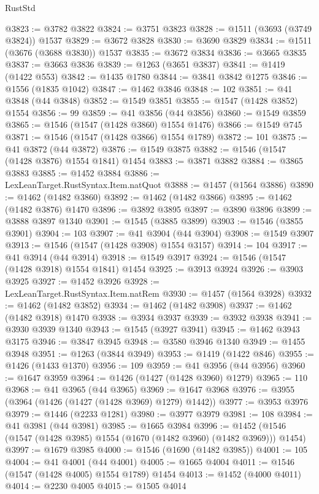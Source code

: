\begin{lexlean}{RustStd}
\begin{coremodule}
{\begin{coremodule}
{{{{{{{{{{{{{{{{{{{{{{{{{{{{{{@3823 := @3782 @3822
@3824 := @3751 @3823
@3828 := @1511 (@3693 (@3749 @3824)) @1537
@3829 := @3672 @3828
@3830 := @3690 @3829
@3834 := @1511 (@3676 (@3688 @3830)) @1537
@3835 := @3672 @3834
@3836 := @3665 @3835
@3837 := @3663 @3836
@3839 := @1263 (@3651 @3837)
@3841 := @1419 (@1422 @553)
@3842 := @1435 @1780
@3844 := @3841 @3842 @1275
@3846 := @1556 (@1835 @1042)
@3847 := @1462 @3846
@3848 := 102
@3851 := @41 @3848 (@44 @3848)
@3852 := @1549 @3851
@3855 := @1547 (@1428 @3852) @1554
@3856 := 99
@3859 := @41 @3856 (@44 @3856)
@3860 := @1549 @3859
@3865 := @1546 (@1547 (@1428 @3860) @1554 @1476)
@3866 := @1549 @745
@3871 := @1546 (@1547 (@1428 @3866) @1554 @1789)
@3872 := 101
@3875 := @41 @3872 (@44 @3872)
@3876 := @1549 @3875
@3882 := @1546 (@1547 (@1428 @3876) @1554 @1841) @1454
@3883 := @3871 @3882
@3884 := @3865 @3883
@3885 := @1452 @3884
@3886 := LexLeanTarget.RustSyntax.Item.natQuot
@3888 := @1457 (@1564 @3886)
@3890 := @1462 (@1482 @3860)
@3892 := @1462 (@1482 @3866)
@3895 := @1462 (@1482 @3876) @1470
@3896 := @3892 @3895
@3897 := @3890 @3896
@3899 := @3888 @3897 @1340
@3901 := @1545 (@3885 @3899)
@3903 := @1546 (@3855 @3901)
@3904 := 103
@3907 := @41 @3904 (@44 @3904)
@3908 := @1549 @3907
@3913 := @1546 (@1547 (@1428 @3908) @1554 @3157)
@3914 := 104
@3917 := @41 @3914 (@44 @3914)
@3918 := @1549 @3917
@3924 := @1546 (@1547 (@1428 @3918) @1554 @1841) @1454
@3925 := @3913 @3924
@3926 := @3903 @3925
@3927 := @1452 @3926
@3928 := LexLeanTarget.RustSyntax.Item.natRem
@3930 := @1457 (@1564 @3928)
@3932 := @1462 (@1482 @3852)
@3934 := @1462 (@1482 @3908)
@3937 := @1462 (@1482 @3918) @1470
@3938 := @3934 @3937
@3939 := @3932 @3938
@3941 := @3930 @3939 @1340
@3943 := @1545 (@3927 @3941)
@3945 := @1462 @3943 @3175
@3946 := @3847 @3945
@3948 := @3580 @3946 @1340
@3949 := @1455 @3948
@3951 := @1263 (@3844 @3949)
@3953 := @1419 (@1422 @846)
@3955 := @1426 (@1433 @1370)
@3956 := 109
@3959 := @41 @3956 (@44 @3956)
@3960 := @1647 @3959
@3964 := @1426 (@1427 (@1428 @3960) @1279)
@3965 := 110
@3968 := @41 @3965 (@44 @3965)
@3969 := @1647 @3968
@3976 := @3955 (@3964 (@1426 (@1427 (@1428 @3969) @1279) @1442))
@3977 := @3953 @3976
@3979 := @1446 (@2233 @1281)
@3980 := @3977 @3979
@3981 := 108
@3984 := @41 @3981 (@44 @3981)
@3985 := @1665 @3984
@3996 := @1452 (@1546 (@1547 (@1428 @3985) @1554 (@1670 (@1482 @3960) (@1482 @3969))) @1454)
@3997 := @1679 @3985
@4000 := @1546 (@1690 (@1482 @3985))
@4001 := 105
@4004 := @41 @4001 (@44 @4001)
@4005 := @1665 @4004
@4011 := @1546 (@1547 (@1428 @4005) @1554 @1789) @1454
@4013 := @1452 (@4000 @4011)
@4014 := @2230 @4005
@4015 := @1505 @4014
}}}}}}}}}}}}}}}}}}}}}}}}}}}}}}
\end{coremodule}}
\end{coremodule}
\end{lexlean}

